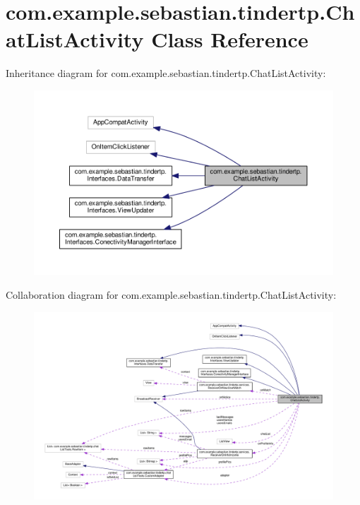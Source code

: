 \hypertarget{classcom_1_1example_1_1sebastian_1_1tindertp_1_1ChatListActivity}{}\section{com.\+example.\+sebastian.\+tindertp.\+Chat\+List\+Activity Class Reference}
\label{classcom_1_1example_1_1sebastian_1_1tindertp_1_1ChatListActivity}


Inheritance diagram for com.\+example.\+sebastian.\+tindertp.\+Chat\+List\+Activity\+:\nopagebreak
\begin{figure}[H]
\begin{center}
\leavevmode
\includegraphics[width=350pt]{classcom_1_1example_1_1sebastian_1_1tindertp_1_1ChatListActivity__inherit__graph}
\end{center}
\end{figure}


Collaboration diagram for com.\+example.\+sebastian.\+tindertp.\+Chat\+List\+Activity\+:
\nopagebreak
\begin{figure}[H]
\begin{center}
\leavevmode
\includegraphics[width=350pt]{classcom_1_1example_1_1sebastian_1_1tindertp_1_1ChatListActivity__coll__graph}
\end{center}
\end{figure}
